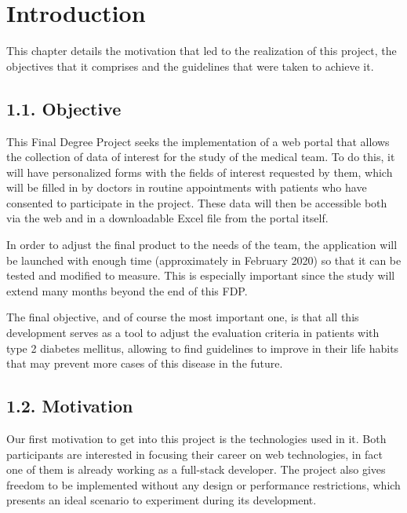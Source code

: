 \chapter*{Introduction}
This chapter details the motivation that led to the realization of this project, the objectives that it comprises and the guidelines that were taken to achieve it.


    \section*{1.1. Objective}
    
    This Final Degree Project seeks the implementation of a web portal that allows the collection of data of interest for the study of the medical team. To do this, it will have personalized forms with the fields of interest requested by them, which will be filled in by doctors in routine appointments with patients who have consented to participate in the project. These data will then be accessible both via the web and in a downloadable Excel file from the portal itself.\newline
	
    In order to adjust the final product to the needs of the team, the application will be launched with 
    enough time (approximately in February 2020) so that it can be tested and modified to measure. This is especially important since the study will extend many months beyond the end of this FDP.\newline
	
	The final objective, and of course the most important one, is that all this development serves as a tool to adjust the evaluation criteria in patients with type 2 diabetes mellitus, allowing to find guidelines to improve in their life habits that may prevent more cases of this disease in the future.\newpage
	
	\section*{1.2. Motivation}
    
    Our first motivation to get into this project is the technologies used in it. Both participants are interested in focusing their career on web technologies, in fact one of them is already working as a full-stack developer. The project also gives freedom to be implemented without any design or performance restrictions, which presents an ideal scenario to experiment during its development.\newline
	
